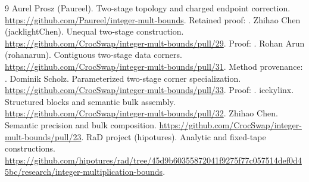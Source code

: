 \documentclass[11pt]{article}
\begin{document}
\begin{thebibliography}{9}
 Aurel Prosz (Paureel). Two-stage topology and charged
endpoint correction. \url{https://github.com/Paureel/integer-mult-bounds}.
Retained proof: .
 Zhihao Chen (jacklightChen). Unequal two-stage construction.
\url{https://github.com/CrocSwap/integer-mult-bounds/pull/29}.
Proof: .
 Rohan Arun (rohanarun). Contiguous two-stage data corners.
\url{https://github.com/CrocSwap/integer-mult-bounds/pull/31}.
Method provenance: .
 Dominik Scholz. Parameterized two-stage corner specialization.
\url{https://github.com/CrocSwap/integer-mult-bounds/pull/33}.
Proof: .
 icekylinx. Structured blocks and semantic bulk assembly.
\url{https://github.com/CrocSwap/integer-mult-bounds/pull/32}.
 Zhihao Chen. Semantic precision and bulk composition.
\url{https://github.com/CrocSwap/integer-mult-bounds/pull/23}.
 RaD project (hipotures). Analytic and fixed-tape constructions.
\url{https://github.com/hipotures/rad/tree/45d9b60355872041f9275f77c057514def0d45bc/research/integer-multiplication-bounds}.
\end{thebibliography}
\end{document}
